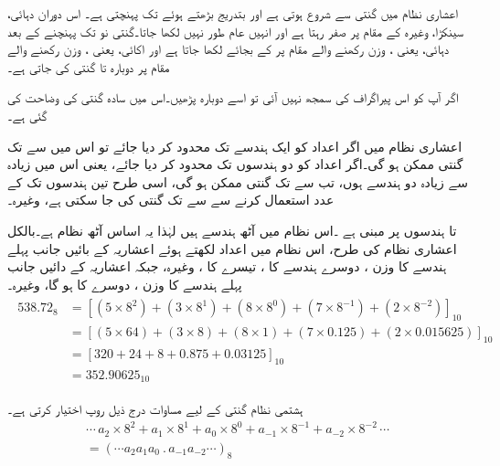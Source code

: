 	اعشاری نظام میں گنتی  سے شروع ہوتی ہے اور بتدریج بڑھتے ہوئے  تک پہنچتی ہے۔ اس دوران دہائی، سینکڑا، وغیرہ کے مقام پر صفر رہتا ہے اور انہیں عام طور نہیں لکھا جاتا۔گنتی نو تک پہنچنے کے بعد دہائی، یعنی ، وزن رکھنے والے مقام پر  کے بجائے  لکھا جاتا ہے اور اکائی، یعنی ، وزن رکھنے والے مقام پر دوبارہ  تا  گنتی کی جاتی ہے۔ 
	
	اگر آپ کو اس پیراگراف کی سمجھ نہیں آئی تو اسے دوبارہ پڑھیں۔اس میں سادہ گنتی کی وضاحت کی گئی ہے۔ 
	
	اعشاری نظام میں اگر اعداد کو ایک ہندسے تک محدود کر دیا جائے تو اس میں  سے  تک گنتی ممکن ہو گی۔اگر اعداد کو دو ہندسوں تک محدود کر دیا جائے، یعنی اس میں زیادہ سے زیادہ دو ہندسے ہوں، تب  سے  تک گنتی ممکن ہو گی، اسی طرح تین ہندسوں تک کے عدد استعمال کرنے سے  سے  تک گنتی کی جا سکتی ہے، وغیرہ۔
	 


	  تا  ہندسوں پر مبنی ہے ۔اس نظام میں آٹھ ہندسے ہیں لہٰذا یہ اساس آٹھ نظام ہے۔بالکل اعشاری نظام کی طرح، اس نظام میں اعداد لکھتے ہوئے اعشاریہ کے بائیں جانب پہلے ہندسے کا وزن  ، دوسرے ہندسے کا  ، تیسرے کا ، وغیرہ، جبکہ اعشاریہ کے دائیں جانب پہلے ہندسے کا وزن ، دوسرے کا  ہو گا، وغیرہ۔
\begin{gather}
\begin{aligned}\label{مساوات_ثنائی_آٹھ}
538.72_8&=[(5\times 8^2)+(3\times 8^1)+(8\times8^0)+(7\times 8^{-1})+(2\times 8^{-2})]_{10}\\
&=[(5\times 64)+(3\times 8)+(8\times 1)+(7\times 0.125)+(2\times 0.015625)]_{10}\\
&=[320+24+8+0.875+0.03125]_{10}\\
&=352.90625_{10}
\end{aligned}
\end{gather}

	 ہشتمی نظام گنتی کے لیے مساوات  درج ذیل روپ اختیار کرتی ہے۔
\begin{multline}
\cdots\, a_2\times 8^2+a_1\times 8^1+a_0\times 8^0+a_{-1}\times 8^{-1}+a_{-2}\times 8^{-2}\,\cdots\\
=(\cdots a_2a_1a_0\ . \,a_{-1}a_{-2}\cdots)_{8}
\end{multline}

